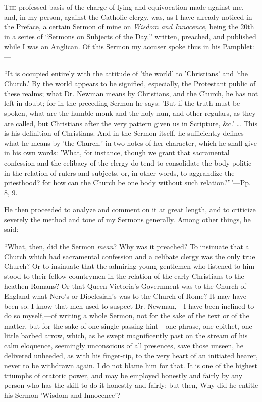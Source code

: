 
T\textsc{he} professed
basis of the charge of lying and equivocation made against me, and, in
my person, against the Catholic clergy, was, as I have already noticed
in the Preface, a certain Sermon of mine on \emph{Wisdom and
Innocence}, being the 20th in a series of ``Sermons on Subjects
of the Day,'' written, preached, and published while I was an
Anglican. Of this Sermon my accuser spoke thus in his Pamphlet:—

``It is occupied entirely with the attitude of 'the world' to
'Christians' and 'the Church.' By the world appears to be signified, especially, the
Protestant public of these realms; what Dr. Newman means by
Christians, and the Church, he has not left in doubt; for in the
preceding Sermon he says: 'But if the truth must be spoken, what are the
humble monk and the holy nun, and other regulars, as they are called,
but Christians after the very pattern given us in Scripture, \&c.'
… This is his definition of Christians. And in the Sermon itself, he
sufficiently defines what he means by 'the Church,' in two notes of her
character, which he shall give in his own words: 'What, for instance,
though we grant that sacramental confession and the celibacy of the
clergy do tend to consolidate the body politic in the relation of rulers
and subjects, or, in other words, to aggrandize the priesthood? for how
can the Church be one body without such relation?'''—Pp. 8, 9.

He then proceeded to analyze and comment on it at great length,
and to criticize severely the method and tone of my Sermons generally.
Among other things, he said:—

``What, then, did the Sermon \emph{mean}? Why was it preached?
To insinuate that a Church which
had sacramental confession and a celibate clergy was the only true
Church? Or to insinuate that the admiring young gentlemen who
listened to him stood to their fellow-countrymen in the relation of the
early Christians to the heathen Romans? Or that Queen Victoria's
Government was to the Church of England what Nero's or Dioclesian's was
to the Church of Rome? It may have been so. I know that men used
to suspect Dr. Newman,—I have been inclined to do so myself,—of
writing a whole Sermon, not for the sake of the text or of the matter,
but for the sake of one single passing hint—one phrase, one epithet,
one little barbed arrow, which, as he swept magnificently past on the
stream of his calm eloquence, seemingly unconscious of all presences,
save those unseen, he delivered unheeded, as with his finger-tip, to the
very heart of an initiated hearer, never to be withdrawn again. I do not
blame him for that. It is one of the highest triumphs of oratoric power,
and may be employed honestly and fairly by any person who has the skill
to do it honestly and fairly; but then, Why did he entitle his Sermon
'Wisdom and Innocence'?


